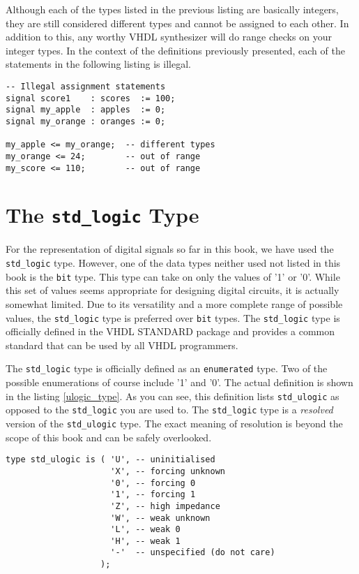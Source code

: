 Although each of the types listed in the previous listing are basically integers, they are still considered different types and cannot be assigned to each other. In addition to this, any worthy VHDL synthesizer will do range checks on your integer types. In the context of the definitions previously presented, each of the statements in the following listing is illegal. 
\vspace{8pt}

\begin{minipage}{0.99\linewidth}
\begin{lstlisting}
-- Illegal assignment statements
signal score1    : scores  := 100;  
signal my_apple  : apples  := 0; 
signal my_orange : oranges := 0; 

my_apple <= my_orange;  -- different types
my_orange <= 24;        -- out of range
my_score <= 110;        -- out of range
\end{lstlisting}
\end{minipage}

\section{The \texttt{std\_logic} Type}
For the representation of digital signals so far in this book, we have used the \texttt{std\_logic} type. However, one of the data types neither used not listed in this book is the \texttt{bit} type. This type can take on only the values of '1' or '0'. While this set of values seems appropriate for designing digital circuits, it is actually somewhat limited. Due to its versatility and a more complete range of possible values, the \texttt{std\_logic} type is preferred over \texttt{bit} types. The \texttt{std\_logic} type is officially defined in the VHDL STANDARD package and provides a common standard that can be used by all VHDL programmers.

The \texttt{std\_logic} type is officially defined as an \texttt{enumerated} type. Two of the possible enumerations of course include '1' and '0'. The actual definition is shown in the listing \ref{ulogic_type}. As you can see, this definition lists \texttt{std\_ulogic} as opposed to the \texttt{std\_logic} you are used to. The \texttt{std\_logic} type is a \textit{resolved} version of the \texttt{std\_ulogic} type. The exact meaning of resolution is beyond the scope of this book and can be safely overlooked. 

\begin{minipage}{0.99\linewidth}
\begin{lstlisting}[label=ulogic_type, caption=Declaration of the \texttt{std\_ulogic} enumerated type.]
type std_ulogic is ( 'U', -- uninitialised 
                     'X', -- forcing unknown
                     '0', -- forcing 0
                     '1', -- forcing 1
                     'Z', -- high impedance
                     'W', -- weak unknown
                     'L', -- weak 0
                     'H', -- weak 1
                     '-'  -- unspecified (do not care) 
                   );
\end{lstlisting}
\end{minipage}


